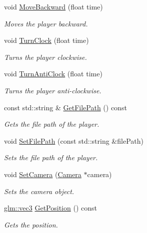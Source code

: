 \begin{CompactItemize}
void \hyperlink{class_player_0de705c108e85cf8609ac827319fe11b}{MoveBackward} (float time)
\begin{CompactList}\small\item\em Moves the player backward. \item\end{CompactList}\item 
void \hyperlink{class_player_f7ca641f9d3134c96b8039919b6f8876}{TurnClock} (float time)
\begin{CompactList}\small\item\em Turns the player clockwise. \item\end{CompactList}\item 
void \hyperlink{class_player_5e09b10a0ae73a3714267c87bd43f95d}{TurnAntiClock} (float time)
\begin{CompactList}\small\item\em Turns the player anti-clockwise. \item\end{CompactList}\item 
const std::string \& \hyperlink{class_player_42cc1504610f6ceff2eed808b5e6edf5}{GetFilePath} () const 
\begin{CompactList}\small\item\em Gets the file path of the player. \item\end{CompactList}\item 
void \hyperlink{class_player_033b610c332fd8266d403d8383a4f869}{SetFilePath} (const std::string \&filePath)
\begin{CompactList}\small\item\em Sets the file path of the player. \item\end{CompactList}\item 
void \hyperlink{class_player_4747c299dc385f1aeb6ade65d67962bf}{SetCamera} (\hyperlink{class_camera}{Camera} $\ast$camera)
\begin{CompactList}\small\item\em Sets the camera object. \item\end{CompactList}\item 
\hyperlink{group__core__types_g1c47e8b3386109bc992b6c48e91b0be7}{glm::vec3} \hyperlink{class_player_78a1bb11afc7985ce85e93b496d72879}{GetPosition} () const 
\begin{CompactList}\small\item\em Gets the position. \item\end{CompactList}\item 

\end{CompactItemize}
